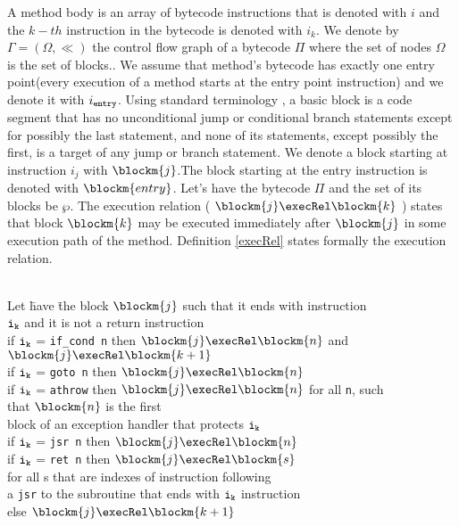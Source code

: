  A method body is an array of bytecode instructions that is denoted with $i$ and the $k-th$ instruction
 in the bytecode is  denoted with $i_{k}$.
 We denote by $\Gamma  = ( \Omega, \ll)$ the control flow graph of a
bytecode $\Pi$ where the set of nodes $\Omega$ is the set of
blocks.. We assume that method's bytecode has exactly one entry point(every execution of a method starts at the entry point instruction) and we denote it with $i_{\tt{entry}}$.  Using standard terminology \cite{ARUCom1986}, a
basic block is a code segment that has no unconditional jump or
conditional branch statements except for possibly the last
statement, and none of its statements, except possibly the first,
is a target of any jump or branch statement. 
 We denote a block starting at instruction  $i_{j}$ with $\blockm{j}$.The block starting at the entry instruction is denoted with $\blockm{entry}$. Let's have 
the bytecode $\Pi$ and the set of its blocks be $\wp$. The execution relation ( $\blockm{j} \execRel \blockm{k}$ ) states that block
$ \blockm{k}$ may be executed immediately after $\blockm{j}$ in some execution path of the method. 
Definition \ref{execRel} states formally the execution relation.
\begin{defn}\label{execRel}
\begin{tabbing}
\\Let \=  have \= the block $\blockm{j}$ such that  it ends with instruction \\ 
$\tt{i_{k}}$ and it is not a return instruction\\
\>  if $\tt{i_{k}}$ = \texttt{if\_cond n} then   $\blockm{j} \execRel \blockm{n}$ and $\blockm{j} \execRel  \blockm{k+1} $ \\
\>  if $\tt{i_{k}}$ = \texttt{goto n} then $\blockm{j} \execRel \blockm{n}$ \\
\>  if $\tt{i_{k}}$ = \texttt{athrow} then $\blockm{j} \execRel \blockm{n}$ for all \texttt{n}, such \\
\> \> that $\blockm{n}$ is the first\\
\> \> block of an exception handler that protects $\tt{i_{k}}$ \\
\>  if $\tt{i_{k}}$ = \texttt{jsr n} then $\blockm{j} \execRel \blockm{n}$ \\
\>  if  $\tt{i_{k}}$ = \texttt{ret n} then  $ \blockm{j} \execRel \blockm{s}$\\
\> \> for all s that are indexes of instruction following \\
\> \> a \texttt{jsr} to the subroutine that ends with $\tt{i_{k}}$ instruction\\
\>  else $\blockm{j}  \execRel   \blockm{k+1}$
\end{tabbing}
\end{defn}

